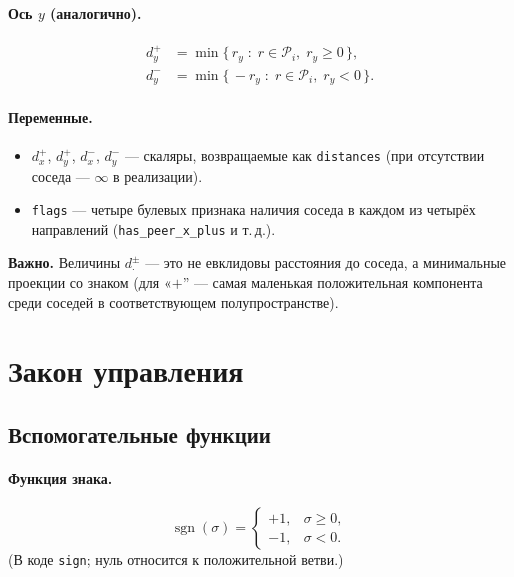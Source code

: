 \documentclass[12pt,a4paper]{article}
\begin{document}
\paragraph{Ось $y$ (аналогично).}
\begin{align}
  d_y^+ &= \min \{\, r_y \;:\; r \in \mathcal{P}_i,\; r_y \ge 0 \,\}, \\
  d_y^- &= \min \{\, -r_y \;:\; r \in \mathcal{P}_i,\; r_y < 0 \,\}.
\end{align}

\paragraph{Переменные.}
\begin{itemize}
  \item $d_x^+$, $d_y^+$, $d_x^-$, $d_y^-$ --- скаляры, возвращаемые как \texttt{distances} (при отсутствии соседа --- $\infty$ в реализации).
  \item \texttt{flags} --- четыре булевых признака наличия соседа в каждом из четырёх направлений (\texttt{has\_peer\_x\_plus} и т.\,д.).
\end{itemize}

\textbf{Важно.} Величины $d_\cdot^\pm$ --- это не евклидовы расстояния до соседа, а минимальные проекции со знаком (для «$+$'' --- самая маленькая положительная компонента среди соседей в соответствующем полупространстве).

\section{Закон управления}
\label{sec:control}

\subsection{Вспомогательные функции}

\paragraph{Функция знака.}
\begin{equation}
  \operatorname{sgn}(\sigma) =
  \begin{cases}
    +1, & \sigma \ge 0, \\
    -1, & \sigma < 0.
  \end{cases}
\end{equation}
(В коде \texttt{sign}; нуль относится к положительной ветви.)
\end{document}

